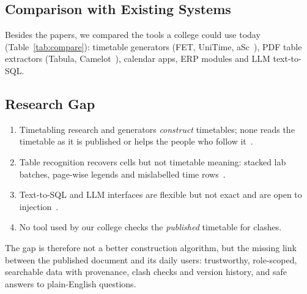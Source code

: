 \subsection{Comparison with Existing Systems}
Besides the papers, we compared the tools a college could use today (Table~\ref{tab:compare}):
timetable generators (FET, UniTime, aSc~\cite{fet,unitime,asc}), PDF table extractors (Tabula,
Camelot~\cite{tabula,camelot}), calendar apps, ERP modules and LLM text-to-SQL.


\subsection{Research Gap}\label{sec:gap}
\begin{enumerate}
\item Timetabling research and generators \emph{construct} timetables; none reads the timetable as it
      is published or helps the people who follow it~\cite{schaerf1999,burke2002,lewis2008}.
\item Table recognition recovers cells but not timetable meaning: stacked lab batches, page-wise
      legends and mislabelled time rows~\cite{zanibbi2004,gobel2013}.
\item Text-to-SQL and LLM interfaces are flexible but not exact and are open to
      injection~\cite{yu2018,greshake2023,pedro2023}.
\item No tool used by our college checks the \emph{published} timetable for clashes.
\end{enumerate}
The gap is therefore not a better construction algorithm, but the missing link between the published
document and its daily users: trustworthy, role-scoped, searchable data with provenance, clash checks
and version history, and safe answers to plain-English questions.
\newpage
